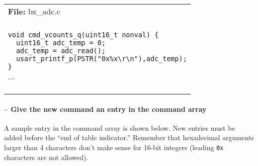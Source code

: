 \begin{center}
  \vspace{-\baselineskip}
  \begin{tabular}{|l|} \hline
    \rowcolor[gray]{0.8}
    \begin{minipage}[c]{\textwidth - 2\tabcolsep}
      \textbf{File:}
      bx\_adc.c
    \end{minipage}\\
    \begin{minipage}[c]{\textwidth - 2\tabcolsep}
      \vspace{0.5\baselineskip}
      $\cdots$ \\
      \begin{minipage}[c]{\textwidth - 2\tabcolsep}
        \lstset{language=c}
        \begin{lstlisting}
void cmd_vcounts_q(uint16_t nonval) {
  uint16_t adc_temp = 0;
  adc_temp = adc_read();
  usart_printf_p(PSTR("0x%x\r\n"),adc_temp);
}
        \end{lstlisting}
      \end{minipage}
      $\cdots$\\
      \vspace{-0.5\baselineskip}
    \end{minipage}\\
    \hline
  \end{tabular}
\end{center}


\paragraph{ -- Give the new command an entry in the command array}
\label{stp:cmd_array}
A sample entry in the command array is shown below.  New entries must
be added before the ``end of table indicator.'' Remember that
hexadecimal arguments larger than 4 characters don't make sense for
16-bit integers (leading \texttt{0x} characters are not allowed).

